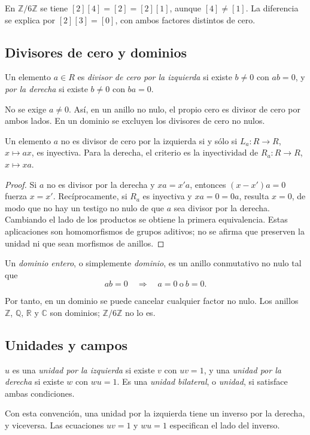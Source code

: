 \begin{ejem}
En $\mathbb Z/6\mathbb Z$ se tiene $[2][4]=[2]=[2][1]$, aunque $[4]\ne[1]$. La diferencia se explica por $[2][3]=[0]$, con ambos factores distintos de cero.
\end{ejem}

\subsection{Divisores de cero y dominios}\label{tema:11-1-2}
\begin{defi}
Un elemento $a\in R$ es \emph{divisor de cero por la izquierda} si existe $b\ne0$ con $ab=0$, y \emph{por la derecha} si existe $b\ne0$ con $ba=0$.
\end{defi}
No se exige $a\ne0$. Así, en un anillo no nulo, el propio cero es divisor de cero por ambos lados. En un dominio se excluyen los divisores de cero no nulos.

\begin{prop}\label{prop:C11-cancelacion}
Un elemento $a$ no es divisor de cero por la izquierda si y sólo si $L_a:R\to R$, $x\mapsto ax$, es inyectiva. Para la derecha, el criterio es la inyectividad de $R_a:R\to R$, $x\mapsto xa$.
\end{prop}
\begin{proof}
Si $a$ no es divisor por la derecha y $xa=x'a$, entonces $(x-x')a=0$ fuerza $x=x'$. Recíprocamente, si $R_a$ es inyectiva y $xa=0=0a$, resulta $x=0$, de modo que no hay un testigo no nulo de que $a$ sea divisor por la derecha. Cambiando el lado de los productos se obtiene la primera equivalencia. Estas aplicaciones son homomorfismos de grupos aditivos; no se afirma que preserven la unidad ni que sean morfismos de anillos.
\end{proof}

\begin{defi}
Un \emph{dominio entero}, o simplemente \emph{dominio}, es un anillo conmutativo no nulo tal que
\[
ab=0\quad\Longrightarrow\quad a=0\ \text{o}\ b=0.
\]
\end{defi}
Por tanto, en un dominio se puede cancelar cualquier factor no nulo. Los anillos $\mathbb Z$, $\mathbb Q$, $\mathbb R$ y $\mathbb C$ son dominios; $\mathbb Z/6\mathbb Z$ no lo es.

\subsection{Unidades y campos}\label{tema:11-1-3}
\begin{defi}
$u$ es una \emph{unidad por la izquierda} si existe $v$ con $uv=1$, y una \emph{unidad por la derecha} si existe $w$ con $wu=1$. Es una \emph{unidad bilateral}, o \emph{unidad}, si satisface ambas condiciones.
\end{defi}
\begin{obs}
Con esta convención, una unidad por la izquierda tiene un inverso por la derecha, y viceversa. Las ecuaciones $uv=1$ y $wu=1$ especifican el lado del inverso.
\end{obs}

